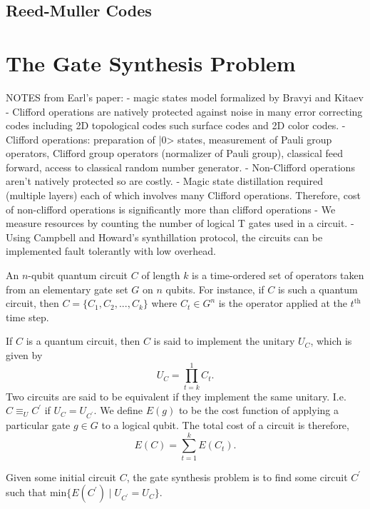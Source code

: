 \documentclass{article}
\theoremstyle{definition}
\theoremstyle{problem}
\theoremstyle{lemma}
\begin{document}
		\subsection{Reed-Muller Codes}
	
	\section{The Gate Synthesis Problem}
	NOTES from Earl's paper:
		- magic states model formalized by Bravyi and Kitaev
		- Clifford operations are natively protected against noise in many error correcting codes including 2D topological codes such surface codes and 2D color codes.
		- Clifford operations: preparation of |0> states, measurement of Pauli group operators, Clifford group operators (normalizer of Pauli group), classical feed forward, access to classical random number generator.
		- Non-Clifford operations aren't natively protected so are costly.
		- Magic state distillation required (multiple layers) each of which involves many Clifford operations. Therefore, cost of non-clifford operations is significantly more than clifford operations
		- We measure resources by counting the number of logical T gates used in a circuit.
		- Using Campbell and Howard's synthillation protocol, the circuits can be implemented fault tolerantly with low overhead.
	
	An $n$-qubit quantum circuit $C$ of length $k$ is a time-ordered set of operators taken from an elementary gate set $G$ on $n$ qubits. For instance, if $C$ is such a quantum circuit, then $C = \{C_1,C_2,...,C_k\}$ where $C_t\in G^n$ is the operator applied at the $t^\text{th}$ time step.
	
	If $C$ is a quantum circuit, then $C$ is said to implement the unitary $U_C$, which is given by
	\begin{equation}
	U_C = \prod_{t = k}^1 C_t.
	\end{equation}
	Two circuits are said to be equivalent if they implement the same unitary. I.e. $C \equiv_U C^\prime$ if $U_C = U_{C^\prime}$. We define $E(g)$ to be the cost function of applying a particular gate $g\in G$ to a logical qubit. The total cost of a circuit is therefore,
	\begin{equation}
	\label{e_Cost}
	E(C) = \sum_{t=1}^k E(C_t).
	\end{equation}
	
	Given some initial circuit $C$, the gate synthesis problem is to find some circuit $C^\prime$ such that $\text{min}\{E(C^\prime) \mid U_{C^\prime} = U_C\}$.
	
\end{document}
